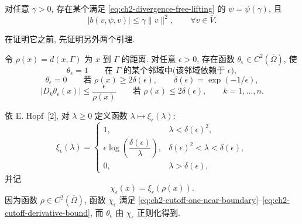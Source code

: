 \begin{Proof}
\begin{Lemma}
\label{lem:ch2-small-divergence-free-lifting}
对任意 $\gamma>0$, 存在某个满足 \eqref{eq:ch2-divergence-free-lifting} 的 $\psi=\psi(\gamma)$, 且
\begin{equation}
|b(v,\psi,v)|\leq\gamma\lVert v\rVert^2,
\qquad\forall v\in\overline V.
\label{eq:ch2-lifting-arbitrary-smallness}
\end{equation}
\end{Lemma}

在证明它之前, 先证明另外两个引理.

\begin{Lemma}
\label{lem:ch2-boundary-cutoff}
令 $\rho(x)=d(x,\Gamma)$ 为 $x$ 到 $\Gamma$ 的距离. 对任意 $\epsilon>0$, 存在函数 $\theta_\epsilon\in C^2(\overline\Omega)$, 使
\begin{equation}
\theta_\epsilon=1
\qquad\text{在 }\Gamma\text{ 的某个邻域中(该邻域依赖于 }\epsilon),
\label{eq:ch2-cutoff-one-near-boundary}
\end{equation}
\begin{equation}
\theta_\epsilon=0
\qquad\text{若 }\rho(x)\geq2\delta(\epsilon),
\qquad\delta(\epsilon)=\exp(-1/\epsilon),
\label{eq:ch2-cutoff-support}
\end{equation}
\begin{equation}
|D_k\theta_\epsilon(x)|\leq\frac\epsilon{\rho(x)}
\qquad\text{若 }\rho(x)\leq2\delta(\epsilon),
\qquad k=1,\ldots,n.
\label{eq:ch2-cutoff-derivative-bound}
\end{equation}
\end{Lemma}

\hypertarget{chapter-02-page-133}{}
\begin{Proof}
依 E. Hopf~[2], 对 $\lambda\geq0$ 定义函数 $\lambda\mapsto\xi_\epsilon(\lambda)$:
\begin{equation}
\xi_\epsilon(\lambda)=
\begin{cases}
1,&\lambda<\delta(\epsilon)^2,\\
\epsilon\log\!\left(\dfrac{\delta(\epsilon)}\lambda\right),
&\delta(\epsilon)^2<\lambda<\delta(\epsilon),\\
0,&\lambda>\delta(\epsilon),
\end{cases}
\label{eq:ch2-hopf-cutoff-profile}
\end{equation}
并记
\begin{equation}
\chi_\epsilon(x)=\xi_\epsilon(\rho(x)).
\label{eq:ch2-hopf-cutoff-composition}
\end{equation}
因为函数 $\rho\in C^2(\overline\Omega)$, 函数 $\chi_\epsilon$ 满足 \eqref{eq:ch2-cutoff-one-near-boundary}--\eqref{eq:ch2-cutoff-derivative-bound}, 而 $\theta_\epsilon$ 由 $\chi_\epsilon$ 正则化得到.
\end{Proof}


\end{Proof}
